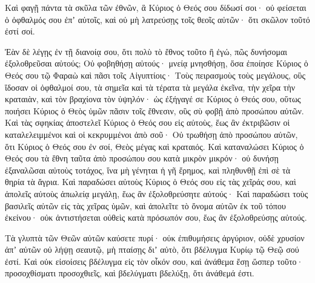 {\par }{\PP {}Καὶ φαγῇ πάντα τὰ σκῦλα τῶν ἐθνῶν, ἃ Κύριος ὁ Θεός σου δίδωσί σοι· οὐ φείσεται ὁ ὀφθαλμός σου ἐπʼ αὐτοῖς, καὶ οὐ μὴ λατρεύσῃς τοῖς θεοῖς αὐτῶν· ὅτι σκῶλον τοῦτό ἐστί σοί.
\par }{\PP {}Ἐὰν δὲ λέγῃς ἐν τῇ διανοίᾳ σου, ὅτι πολὺ τὸ ἔθνος τοῦτο ἢ ἐγώ, πῶς δυνήσομαι ἐξολοθρεῦσαι αὐτούς;
Οὐ φοβηθήσῃ αὐτούς· μνείᾳ μνησθήσῃ, ὅσα ἐποίησε Κύριος ὁ Θεός σου τῷ Φαραὼ καὶ πᾶσι τοῖς Αἰγυπτίοις·
Τοὺς πειρασμοὺς τοὺς μεγάλους, οὓς ἴδοσαν οἱ ὀφθαλμοί σου, τὰ σημεῖα καὶ τὰ τέρατα τὰ μεγάλα ἐκεῖνα, τὴν χεῖρα τὴν κραταιὰν, καὶ τὸν βραχίονα τὸν ὑψηλόν· ὡς ἐξήγαγέ σε Κύριος ὁ Θεός σου, οὕτως ποιήσει Κύριος ὁ Θεὸς ὑμῶν πᾶσιν τοῖς ἔθνεσιν, οὓς σὺ φοβῇ ἀπὸ προσώπου αὐτῶν.
Καὶ τὰς σφηκίας ἀποστελεῖ Κύριος ὁ Θεός σου εἰς αὐτοὺς, ἕως ἂν ἐκτριβῶσιν οἱ καταλελειμμένοι καὶ οἱ κεκρυμμένοι ἀπὸ σοῦ·
Οὐ τρωθήσῃ ἀπὸ προσώπου αὐτῶν, ὅτι Κύριος ὁ Θεός σου ἐν σοί, Θεὸς μέγας καὶ κραταιός.
Καὶ καταναλώσει Κύριος ὁ Θεός σου τὰ ἔθνη ταῦτα ἀπὸ προσώπου σου κατὰ μικρὸν μικρόν· οὐ δυνήσῃ ἐξαναλῶσαι αὐτοὺς τοτάχος, ἵνα μὴ γένηται ἡ γῆ ἔρημος, καὶ πληθυνθῇ ἐπὶ σὲ τὰ θηρία τὰ ἄγρια.
Καὶ παραδώσει αὐτοὺς Κύριος ὁ Θεός σου εἰς τὰς χεῖράς σου, καὶ ἀπολεῖς αὐτοὺς ἀπωλείᾳ μεγάλῃ, ἕως ἂν ἐξολοθρεύσητε αὐτούς·
Καὶ παραδώσει τοὺς βασιλεῖς αὐτῶν εἰς τὰς χεῖρας ὑμῶν, καὶ ἀπολεῖτε τὸ ὄνομα αὐτῶν ἐκ τοῦ τόπου ἐκείνου· οὐκ ἀντιστήσεται οὐθεὶς κατὰ πρόσωπόν σου, ἕως ἂν ἐξολοθρεύσῃς αὐτούς.
\par }{\PP {}Τὰ γλυπτὰ τῶν Θεῶν αὐτῶν καύσετε πυρί· οὐκ ἐπιθυμήσεις ἀργύριον, οὐδὲ χρυσίον ἀπʼ αὐτῶν οὐ λήψῃ σεαυτῷ, μὴ πταίσῃς διʼ αὐτὸ, ὅτι βδέλυγμα Κυρίῳ τῷ Θεῷ σού ἐστί.
Καὶ οὐκ εἰσοίσεις βδέλυγμα εἰς τὸν οἶκόν σου, καὶ ἀνάθεμα ἔσῃ ὥσπερ τοῦτο· προσοχθίσματι προσοχθιεῖς, καὶ βδελύγματι βδελύξῃ, ὅτι ἀνάθεμά ἐστι.

}
